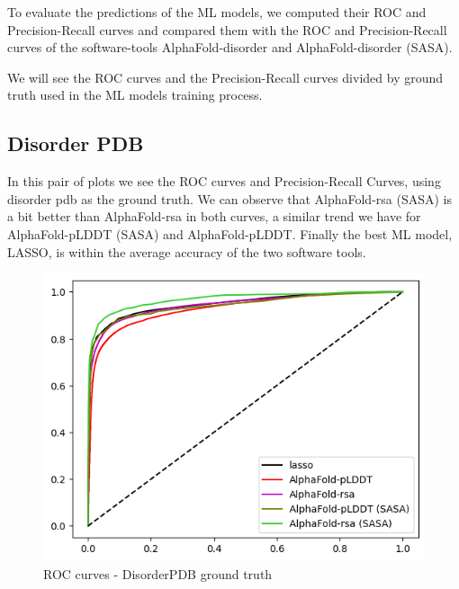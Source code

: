 To evaluate the predictions of the ML models, we computed their ROC and Precision-Recall curves and compared them with the ROC and Precision-Recall curves of the software-tools AlphaFold-disorder and AlphaFold-disorder (SASA).

We will see the ROC curves and the Precision-Recall curves divided by ground truth used in the ML models training process.

\vspace{5em}

\pagebreak

\subsection{Disorder PDB}

In this pair of plots we see the ROC curves and Precision-Recall Curves, using disorder pdb as the ground truth. We can observe that AlphaFold-rsa (SASA) is a bit better than AlphaFold-rsa in both curves, a similar trend we have for AlphaFold-pLDDT (SASA) and AlphaFold-pLDDT. Finally the best ML model, LASSO, is within the average accuracy of the two software tools.

\begin{figure}[h!]
    \centering
    \includegraphics[scale = 0.73]{res/ML/roc-disorderpdb.png}
    \caption{ROC curves - DisorderPDB ground truth}
\end{figure}

